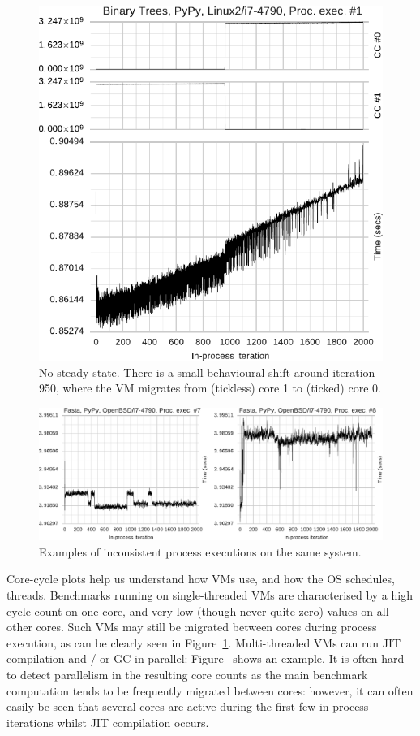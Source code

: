 \documentclass[preprint,numbers,10pt]{sigplanconf}
\begin{document}
\begin{figure}[t]
\centering
\includegraphics[width=.45\textwidth]{examples/new_no_steady.pdf}
\caption{No steady state. There is a small behavioural shift around iteration
950, where the VM migrates from (tickless) core 1 to (ticked) core 0.}
\label{fig:examples:nosteadystate}
\end{figure}

\begin{figure}[t!]
\centering
\includegraphics[width=\textwidth]{examples/new_inconsistent.pdf}
\caption{Examples of inconsistent process executions on the same system.}
\label{fig:examples:inconsistent}
\end{figure}

Core-cycle plots help us understand how VMs use, and how the OS schedules,
threads. Benchmarks running on single-threaded VMs are characterised by a high
cycle-count on one core, and very low (though never quite zero) values on all
other cores. Such VMs may still be migrated between cores during process
execution, as can be clearly seen in Figure~\ref{fig:examples:nosteadystate}.
Multi-threaded VMs can run JIT compilation and / or GC in parallel:
Figure~ shows
an example. It is often hard to detect parallelism in the resulting core counts as
the main benchmark computation tends to be frequently migrated between cores:
however, it can often easily be seen that several cores are active during the first few
in-process iterations whilst JIT compilation occurs.
\end{document}

